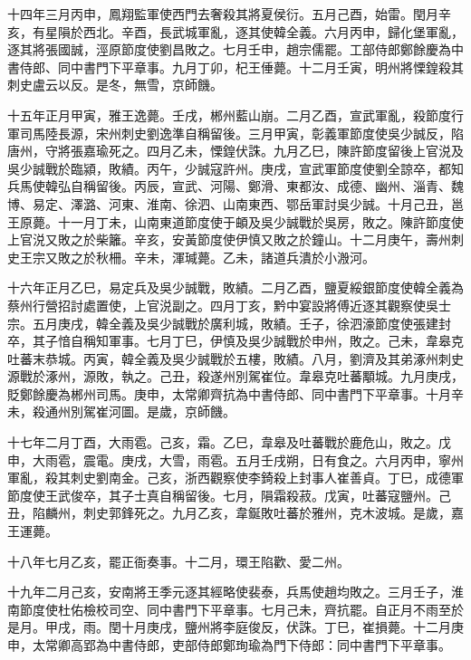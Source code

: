 \begin{pinyinscope}
 十四年三月丙申，鳳翔監軍使西門去奢殺其將夏侯衍。五月己酉，始雷。閏月辛亥，有星隕於西北。辛酉，長武城軍亂，逐其使韓全義。六月丙申，歸化堡軍亂，逐其將張國誠，涇原節度使劉昌敗之。七月壬申，趙宗儒罷。工部侍郎鄭餘慶為中書侍郎、同中書門下平章事。九月丁卯，杞王倕薨。十二月壬寅，明州將慄鍠殺其刺史盧云以反。是冬，無雪，京師饑。



 十五年正月甲寅，雅王逸薨。壬戌，郴州藍山崩。二月乙酉，宣武軍亂，殺節度行軍司馬陸長源，宋州刺史劉逸準自稱留後。三月甲寅，彰義軍節度使吳少誠反，陷唐州，守將張嘉瑜死之。四月乙未，慄鍠伏誅。九月乙巳，陳許節度留後上官涚及吳少誠戰於臨潁，敗績。丙午，少誠寇許州。庚戌，宣武軍節度使劉全諒卒，都知兵馬使韓弘自稱留後。丙辰，宣武、河陽、鄭滑、東都汝、成德、幽州、淄青、魏博、易定、澤潞、河東、淮南、徐泗、山南東西、鄂岳軍討吳少誠。十月己丑，邕王原薨。十一月丁未，山南東道節度使于頔及吳少誠戰於吳房，敗之。陳許節度使上官涚又敗之於柴籬。辛亥，安黃節度使伊慎又敗之於鐘山。十二月庚午，壽州刺史王宗又敗之於秋柵。辛未，渾瑊薨。乙未，諸道兵潰於小溵河。



 十六年正月乙巳，易定兵及吳少誠戰，敗績。二月乙酉，鹽夏綏銀節度使韓全義為蔡州行營招討處置使，上官涚副之。四月丁亥，黔中宴設將傅近逐其觀察使吳士宗。五月庚戌，韓全義及吳少誠戰於廣利城，敗績。壬子，徐泗濠節度使張建封卒，其子愔自稱知軍事。七月丁巳，伊慎及吳少誠戰於申州，敗之。己未，韋皋克吐蕃末恭城。丙寅，韓全義及吳少誠戰於五樓，敗績。八月，劉濟及其弟涿州刺史源戰於涿州，源敗，執之。己丑，殺遂州別駕崔位。韋皋克吐蕃顒城。九月庚戌，貶鄭餘慶為郴州司馬。庚申，太常卿齊抗為中書侍郎、同中書門下平章事。十月辛未，殺通州別駕崔河圖。是歲，京師饑。



 十七年二月丁酉，大雨雹。己亥，霜。乙巳，韋皋及吐蕃戰於鹿危山，敗之。戊申，大雨雹，震電。庚戌，大雪，雨雹。五月壬戌朔，日有食之。六月丙申，寧州軍亂，殺其刺史劉南金。己亥，浙西觀察使李錡殺上封事人崔善貞。丁巳，成德軍節度使王武俊卒，其子士真自稱留後。七月，隕霜殺菽。戊寅，吐蕃寇鹽州。己丑，陷麟州，刺史郭鋒死之。九月乙亥，韋鋋敗吐蕃於雅州，克木波城。是歲，嘉王運薨。



 十八年七月乙亥，罷正衙奏事。十二月，環王陷歡、愛二州。



 十九年二月己亥，安南將王季元逐其經略使裴泰，兵馬使趙均敗之。三月壬子，淮南節度使杜佑檢校司空、同中書門下平章事。七月己未，齊抗罷。自正月不雨至於是月。甲戌，雨。閏十月庚戌，鹽州將李庭俊反，伏誅。丁巳，崔損薨。十二月庚申，太常卿高郢為中書侍郎，吏部侍郎鄭珣瑜為門下侍郎：同中書門下平章事。




\end{pinyinscope}
